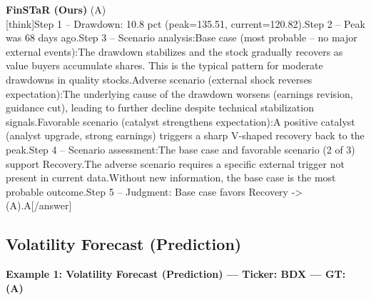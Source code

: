 \begin{minipage}[t]{0.41\textwidth}
\colorbox{green!10}{\parbox{\dimexpr\textwidth-2\fboxsep}{
\textbf{FinSTaR (Ours)} \textcolor{green!50!black}{(A)} \\[2pt]
\tiny
[think]\newline Step 1 -- Drawdown: 10.8 pct (peak=135.51, current=120.82).\newline Step 2 -- Peak was 68 days ago.\newline Step 3 -- Scenario analysis:\newline   Base case (most probable -- no major external events):\newline     The drawdown stabilizes and the stock gradually recovers as value buyers accumulate shares. This is the typical pattern for moderate drawdowns in quality stocks.\newline   Adverse scenario (external shock reverses expectation):\newline     The underlying cause of the drawdown worsens (earnings revision, guidance cut), leading to further decline despite technical stabilization signals.\newline   Favorable scenario (catalyst strengthens expectation):\newline     A positive catalyst (analyst upgrade, strong earnings) triggers a sharp V-shaped recovery back to the peak.\newline Step 4 -- Scenario assessment:\newline   The base case and favorable scenario (2 of 3) support Recovery.\newline   The adverse scenario requires a specific external trigger not present in current data.\newline   Without new information, the base case is the most probable outcome.\newline Step 5 -- Judgment: Base case favors Recovery -> (A).\newline [/think]\newline [answer]A[/answer]
}}
\vspace{-40pt}
\end{minipage}

\clearpage
\subsection{Volatility Forecast (Prediction)}


\noindent
\textbf{Example 1: Volatility Forecast (Prediction) --- Ticker: BDX --- GT: (A)}
\vspace{2pt}


